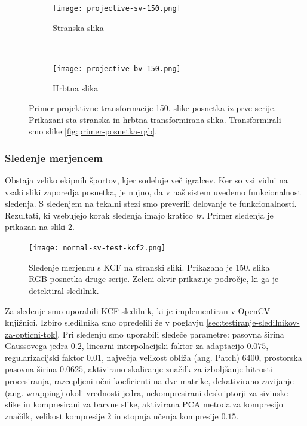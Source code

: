 \begin{figure}[!htb]
	\centering
	\begin{subfigure}[t]{0.45\columnwidth}
		\centering
		\texttt{[image: projective-sv-150.png]}
		\caption{Stranska slika}
	\end{subfigure}
	~
	\begin{subfigure}[t]{0.45\columnwidth}
		\centering
		\texttt{[image: projective-bv-150.png]}
		\caption{Hrbtna slika}
	\end{subfigure}
	\caption[Primer projektivne transformacije 150. slike posnetka iz prve serije]{Primer projektivne transformacije 150. slike posnetka iz prve serije. Prikazani sta stranska in hrbtna transformirana slika. Transformirali smo slike \ref{fig:primer-posnetka-rgb}.}
	\label{fig:projective}
\end{figure}


\subsubsection{Sledenje merjencem}\label{sec:tracking}
Obstaja veliko ekipnih športov, kjer sodeluje več igralcev. Ker so vsi vidni na vsaki sliki zaporedja posnetka, je nujno, da v naš sistem uvedemo funkcionalnost sledenja. S sledenjem na tekalni stezi smo preverili delovanje te funkcionalnosti. Rezultati, ki vsebujejo korak sledenja imajo kratico \textit{tr}. Primer sledenja je prikazan na sliki \ref{fig:sledenje}.

\begin{figure}[!htb]
	\centering
	\texttt{[image: normal-sv-test-kcf2.png]}
	\caption[Sledenje merjencu s KCF na stranski sliki]{Sledenje merjencu s KCF na stranski sliki. Prikazana je 150. slika RGB posnetka druge serije. Zeleni okvir prikazuje področje, ki ga je detektiral sledilnik.}
	\label{fig:sledenje}
\end{figure} 

Za sledenje smo uporabili KCF sledilnik, ki je implementiran v OpenCV knjižnici. Izbiro sledilnika smo opredelili že v poglavju \ref{sec:testiranje-sledilnikov-za-opticni-tok}. Pri sledenju smo uporabili sledeče parametre: pasovna širina Gaussovega jedra $0.2$, linearni interpolacijski faktor za adaptacijo $0.075$, regularizacijski faktor $0.01$, največja velikost obliža (ang. Patch) $6400$, prostorska pasovna širina $0.0625$, aktivirano skaliranje značilk za izboljšanje hitrosti procesiranja, razcepljeni učni koeficienti na dve matrike, dekativirano zavijanje (ang. wrapping) okoli vrednosti jedra, nekompresirani deskriptorji za sivinske slike in kompresirani za barvne slike, aktivirana PCA metoda za kompresijo značilk, velikost kompresije $2$ in  stopnja učenja kompresije $0.15$.


